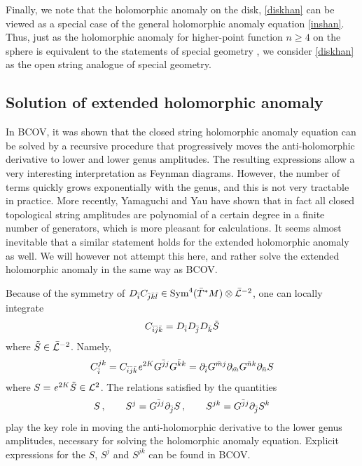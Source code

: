 Finally, we note that the holomorphic anomaly on the disk, \eqref{diskhan} 
can be viewed as a special case of the general holomorphic anomaly 
equation \eqref{inshan}. Thus, just as the holomorphic anomaly for 
higher-point function $n\ge 4$ on the sphere is equivalent to the 
statements of special geometry \cite{bcov2}, we consider \eqref{diskhan} 
as the open string analogue of special geometry.


\subsection{Solution of extended holomorphic anomaly}
\label{hansolutions}

In BCOV, it was shown that the closed string holomorphic
anomaly equation can be solved by a recursive procedure that 
progressively moves the anti-holomorphic derivative to lower and
lower genus amplitudes. The resulting expressions allow a very 
interesting interpretation as Feynman diagrams. However, the 
number of terms quickly grows exponentially with the genus,
and this is not very tractable in practice. More recently,
Yamaguchi and Yau \cite{yayau} have shown that in fact all 
closed topological string amplitudes are polynomial of
a certain degree in a finite number of generators, which is
more pleasant for calculations. It seems almost inevitable 
that a similar statement holds for the extended holomorphic 
anomaly as well. We will however not attempt this here, and 
rather solve the extended holomorphic anomaly in the same way 
as BCOV.

Because of the symmetry of $D_{\bar i} C_{{\bar j}{\bar k}{\bar l}}\in 
{\rm Sym}^4(\bar{T}^*M)\otimes\bar{{\cal L}}^{-2}$, one can locally integrate
\begin{equation}
C_{{\bar i}{\bar j}{\bar k}} = D_{\bar i} D_{\bar j} D_{\bar k} \tilde S
\end{equation}
where $\tilde S\in \bar{{\cal L}}^{-2}$. Namely,
\begin{equation}
C_{{\bar i}}^{jk} = C_{{\bar i}{\bar j}{\bar k}}{\it e}^{2K} G^{{\bar j} j} G^{{\bar k} k} =
\partial_{\bar i} G^{{\bar m} j} \partial_{\bar m} G^{{\bar n} k} \partial_{\bar n} S
\end{equation}
where $S={\it e}^{2K} \tilde S\in {\cal L}^{2}$. The relations satisfied
by the quantities
\begin{equation}
\eqlabel{propagators}
S\,,\qquad S^j = G^{\jb j}\del_\jb S\,,\qquad S^{jk} = G^{\jb j}\del_\jb S^k
\end{equation}
play the key role in moving the anti-holomorphic derivative to
the lower genus amplitudes, necessary for solving the holomorphic
anomaly equation. Explicit expressions for the $S$, $S^j$ and $S^{jk}$ 
can be found in BCOV.

